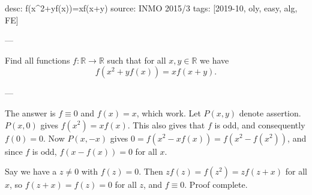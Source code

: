 desc: f(x^2+yf(x))=xf(x+y)
source: INMO 2015/3
tags: [2019-10, oly, easy, alg, FE]

---

Find all functions $f:\mathbb R\to\mathbb R$ such that for all $x,y\in\mathbb R$ we have \[f(x^2+yf(x))=xf(x+y).\]

---

The answer is $f\equiv0$ and $f(x)=x$, which work. Let $P(x,y)$ denote assertion. $P(x,0)$ gives $f(x^2)=xf(x)$. This also gives that $f$ is odd, and consequently $f(0)=0$. Now $P(x,-x)$ gives $0=f\left(x^2-xf(x)\right)=f\left(x^2-f(x^2)\right)$, and since $f$ is odd, $f(x-f(x))=0$ for all $x$.

Say we have a $z\ne0$ with $f(z)=0$. Then $zf(z)=f(z^2)=zf(z+x)$ for all $x$, so $f(z+x)=f(z)=0$ for all $z$, and $f\equiv0$. Proof complete.
